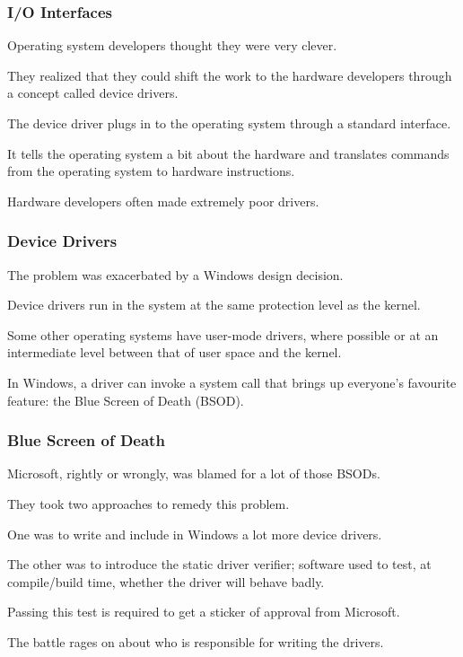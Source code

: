 \begin{frame}
\frametitle{I/O Interfaces}

Operating system developers thought they were very clever. 

They realized that they could shift the work to the hardware developers through a concept called \alert{device drivers}. 

The device driver plugs in to the operating system through a standard interface. 

It tells the operating system a bit about the hardware and translates commands from the operating system to hardware instructions. 

Hardware developers often made extremely poor drivers.

\end{frame}

\begin{frame}
\frametitle{Device Drivers}

The problem was exacerbated by a Windows design decision.

Device drivers run in the system at the same protection level as the kernel. 

Some other operating systems have user-mode drivers, where possible or at an intermediate level between that of user space and the kernel. 

In Windows, a driver can invoke a system call that brings up everyone's favourite feature: the Blue Screen of Death (BSOD).

\end{frame}

\begin{frame}
\frametitle{Blue Screen of Death}

Microsoft, rightly or wrongly, was blamed for a lot of those BSODs. 

They took two approaches to remedy this problem. 

One was to write and include in Windows a lot more device drivers. 

The other was to introduce the static driver verifier; software used to test, at compile/build time, whether the driver will behave badly. 

Passing this test is required to get a sticker of approval from Microsoft.

The battle rages on about who is responsible for writing the drivers.


\end{frame}

